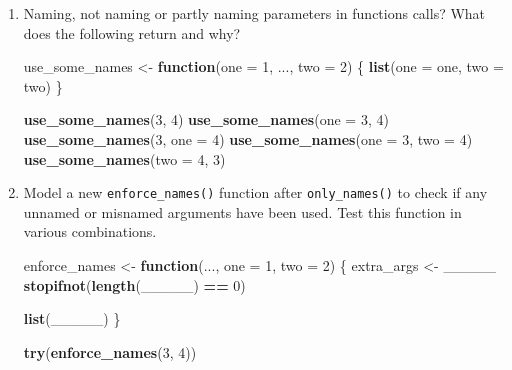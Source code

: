 \documentclass[]{book}
\newenvironment{Shaded}{\begin{snugshade}}{\end{snugshade}}
\newcommand{\ControlFlowTok}[1]{\textcolor[rgb]{0.13,0.29,0.53}{\textbf{#1}}}
\newcommand{\DataTypeTok}[1]{\textcolor[rgb]{0.13,0.29,0.53}{#1}}
\newcommand{\DecValTok}[1]{\textcolor[rgb]{0.00,0.00,0.81}{#1}}
\newcommand{\KeywordTok}[1]{\textcolor[rgb]{0.13,0.29,0.53}{\textbf{#1}}}
\newcommand{\NormalTok}[1]{#1}
\newcommand{\OperatorTok}[1]{\textcolor[rgb]{0.81,0.36,0.00}{\textbf{#1}}}
\newcommand{\StringTok}[1]{\textcolor[rgb]{0.31,0.60,0.02}{#1}}
\begin{document}
\begin{enumerate}
\def\labelenumi{\arabic{enumi}.}
\item
  Naming, not naming or partly naming parameters in functions calls? What does the following return and why?

\begin{Shaded}
\begin{Highlighting}[]
\NormalTok{use_some_names <-}\StringTok{ }\ControlFlowTok{function}\NormalTok{(}\DataTypeTok{one =} \DecValTok{1}\NormalTok{, ..., }\DataTypeTok{two =} \DecValTok{2}\NormalTok{) \{}
  \KeywordTok{list}\NormalTok{(}\DataTypeTok{one =}\NormalTok{ one, }\DataTypeTok{two =}\NormalTok{ two)}
\NormalTok{\}}

\KeywordTok{use_some_names}\NormalTok{(}\DecValTok{3}\NormalTok{, }\DecValTok{4}\NormalTok{)}
\KeywordTok{use_some_names}\NormalTok{(}\DataTypeTok{one =} \DecValTok{3}\NormalTok{, }\DecValTok{4}\NormalTok{)}
\KeywordTok{use_some_names}\NormalTok{(}\DecValTok{3}\NormalTok{, }\DataTypeTok{one =} \DecValTok{4}\NormalTok{)}
\KeywordTok{use_some_names}\NormalTok{(}\DataTypeTok{one =} \DecValTok{3}\NormalTok{, }\DataTypeTok{two =} \DecValTok{4}\NormalTok{)}
\KeywordTok{use_some_names}\NormalTok{(}\DataTypeTok{two =} \DecValTok{4}\NormalTok{, }\DecValTok{3}\NormalTok{)}
\end{Highlighting}
\end{Shaded}
\item
  Model a new \texttt{enforce\_names()} function after \texttt{only\_names()} to check if any unnamed or misnamed arguments have been used. Test this function in various combinations.

\begin{Shaded}
\begin{Highlighting}[]
\NormalTok{enforce_names <-}\StringTok{ }\ControlFlowTok{function}\NormalTok{(..., }\DataTypeTok{one =} \DecValTok{1}\NormalTok{, }\DataTypeTok{two =} \DecValTok{2}\NormalTok{) \{}
\NormalTok{  extra_args <-}\StringTok{ }\NormalTok{_____}
  \KeywordTok{stopifnot}\NormalTok{(}\KeywordTok{length}\NormalTok{(_____) }\OperatorTok{==}\StringTok{ }\DecValTok{0}\NormalTok{)}

  \KeywordTok{list}\NormalTok{(_____)}
\NormalTok{\}}
\end{Highlighting}
\end{Shaded}

\begin{Shaded}
\begin{Highlighting}[]
\KeywordTok{try}\NormalTok{(}\KeywordTok{enforce_names}\NormalTok{(}\DecValTok{3}\NormalTok{, }\DecValTok{4}\NormalTok{))}
\end{Highlighting}
\end{Shaded}


\end{enumerate}
\end{document}
